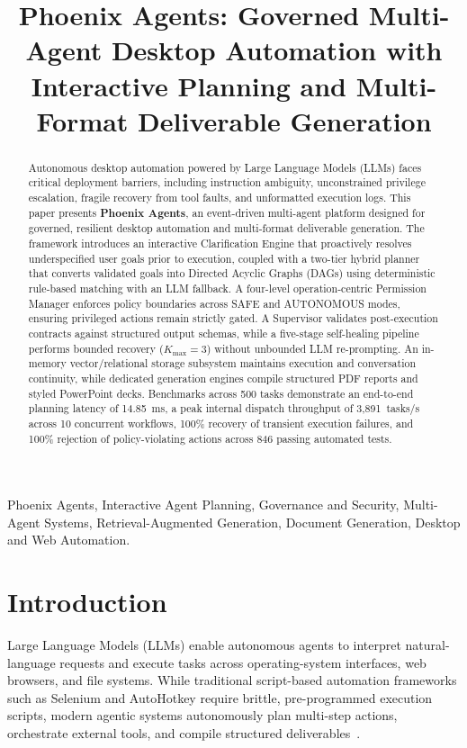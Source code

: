 \documentclass[conference]{IEEEtran}
\title{Phoenix Agents: Governed Multi-Agent Desktop Automation with Interactive Planning and Multi-Format Deliverable Generation}
\author{
\IEEEauthorblockN{Anonymous Authors}
\IEEEauthorblockA{Paper under double-blind review}
}
\begin{document}
\maketitle

\begin{abstract}
Autonomous desktop automation powered by Large Language Models (LLMs) faces critical deployment barriers, including instruction ambiguity, unconstrained privilege escalation, fragile recovery from tool faults, and unformatted execution logs. This paper presents \textbf{Phoenix Agents}, an event-driven multi-agent platform designed for governed, resilient desktop automation and multi-format deliverable generation. The framework introduces an interactive Clarification Engine that proactively resolves underspecified user goals prior to execution, coupled with a two-tier hybrid planner that converts validated goals into Directed Acyclic Graphs (DAGs) using deterministic rule-based matching with an LLM fallback. A four-level operation-centric Permission Manager enforces policy boundaries across SAFE and AUTONOMOUS modes, ensuring privileged actions remain strictly gated. A Supervisor validates post-execution contracts against structured output schemas, while a five-stage self-healing pipeline performs bounded recovery ($K_{\text{max}}=3$) without unbounded LLM re-prompting. An in-memory vector/relational storage subsystem maintains execution and conversation continuity, while dedicated generation engines compile structured PDF reports and styled PowerPoint decks. Benchmarks across 500 tasks demonstrate an end-to-end planning latency of 14.85~ms, a peak internal dispatch throughput of 3,891~tasks/s across 10 concurrent workflows, 100\% recovery of transient execution failures, and 100\% rejection of policy-violating actions across 846 passing automated tests.
\end{abstract}

\begin{IEEEkeywords}
Phoenix Agents, Interactive Agent Planning, Governance and Security, Multi-Agent Systems, Retrieval-Augmented Generation, Document Generation, Desktop and Web Automation.
\end{IEEEkeywords}

\section{Introduction}

Large Language Models (LLMs) enable autonomous agents to interpret natural-language requests and execute tasks across operating-system interfaces, web browsers, and file systems. While traditional script-based automation frameworks such as Selenium and AutoHotkey require brittle, pre-programmed execution scripts, modern agentic systems autonomously plan multi-step actions, orchestrate external tools, and compile structured deliverables~\cite{garcia2026,bajoria2026}.
\end{document}
